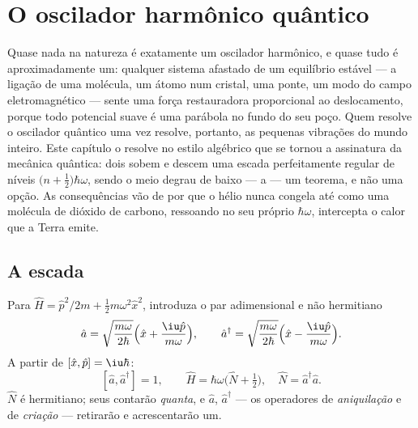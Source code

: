 \chapter{O oscilador harmônico quântico}\label{ch:b3:harmonic-oscillator}

Quase nada na natureza é exatamente um oscilador harmônico, e quase
tudo é aproximadamente um: qualquer sistema afastado de um equilíbrio
estável --- a ligação de uma molécula, um átomo num cristal, uma ponte,
um modo do campo eletromagnético --- sente uma força restauradora
proporcional ao deslocamento, porque todo potencial suave é uma
parábola no fundo do seu poço. Quem resolve o oscilador quântico uma
vez resolve, portanto, as pequenas vibrações do mundo inteiro. Este
capítulo o resolve no estilo algébrico que se tornou a assinatura da
mecânica quântica: dois  sobem e descem uma escada
perfeitamente regular de níveis $\big(n +
\tfrac12\big)\hbar\omega$, sendo o meio degrau de baixo --- a  --- um teorema, e não uma opção. As consequências vão de
por que o hélio nunca congela até como uma molécula de dióxido de
carbono, ressoando no seu próprio $\hbar\omega$, intercepta o calor que
a Terra emite.

\section{A escada}

\begin{definition}\label{def:b3:harmonic-oscillator:ladder}
Para $\hat H = \hat p^2/2m + \tfrac12 m\omega^2\hat x^2$, introduza o
par adimensional e não hermitiano
\[
\hat a = \sqrt{\frac{m\omega}{2\hbar}}\Big(\hat x +
\frac{\iu\hat p}{m\omega}\Big) , \qquad
\hat a^\dagger = \sqrt{\frac{m\omega}{2\hbar}}\Big(\hat x -
\frac{\iu\hat p}{m\omega}\Big) .
\]
A partir de $[\hat x, \hat p] = \iu\hbar$:
\[
[\hat a, \hat a^\dagger] = 1 , \qquad
\hat H = \hbar\omega\Big(\hat N + \tfrac12\Big) , \quad
\hat N = \hat a^\dagger\hat a .
\]
$\hat N$ é hermitiano; seus  contarão \emph{quanta}, e
$\hat a$, $\hat a^\dagger$ --- os operadores de \emph{aniquilação} e de
\emph{criação} --- retirarão e acrescentarão um.
\end{definition}

